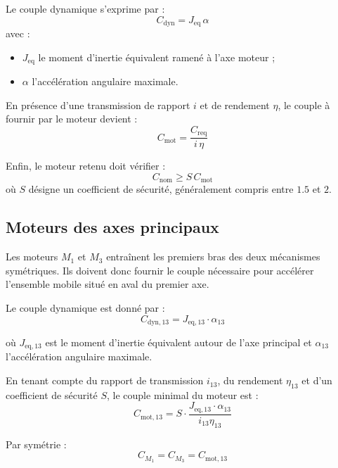 Le couple dynamique s’exprime par :
\begin{equation}
    C_{\mathrm{dyn}} = J_{\mathrm{eq}} \, \alpha
\end{equation}
avec :
\begin{itemize}
    \item $J_{\mathrm{eq}}$ le moment d’inertie équivalent ramené à l’axe moteur ;
    \item $\alpha$ l’accélération angulaire maximale.
\end{itemize}

En présence d’une transmission de rapport $i$ et de rendement $\eta$, le couple
à fournir par le moteur devient :
\begin{equation}
    C_{\mathrm{mot}} = \frac{C_{\mathrm{req}}}{i \, \eta}
\end{equation}

Enfin, le moteur retenu doit vérifier :
\begin{equation}
    C_{\mathrm{nom}} \geq S \, C_{\mathrm{mot}}
\end{equation}
où $S$ désigne un coefficient de sécurité, généralement compris entre $1.5$ et $2$.
\subsection{Moteurs des axes principaux}
Les moteurs $M_1$ et $M_3$ entraînent les premiers bras des deux mécanismes
symétriques. Ils doivent donc fournir le couple nécessaire pour accélérer
l’ensemble mobile situé en aval du premier axe.

Le couple dynamique est donné par :
\begin{equation}
    C_{\mathrm{dyn},13} = J_{\mathrm{eq},13} \cdot \alpha_{13}
\end{equation}

où $J_{\mathrm{eq},13}$ est le moment d’inertie équivalent autour de l’axe
principal et $\alpha_{13}$ l’accélération angulaire maximale.

En tenant compte du rapport de transmission $i_{13}$, du rendement $\eta_{13}$
et d’un coefficient de sécurité $S$, le couple minimal du moteur est :
\begin{equation}
    C_{\mathrm{mot},13} =
    S \cdot \frac{J_{\mathrm{eq},13} \cdot \alpha_{13}}{i_{13}\eta_{13}}
\end{equation}

Par symétrie :
\begin{equation}
    C_{M_1} = C_{M_3} = C_{\mathrm{mot},13}
\end{equation}
